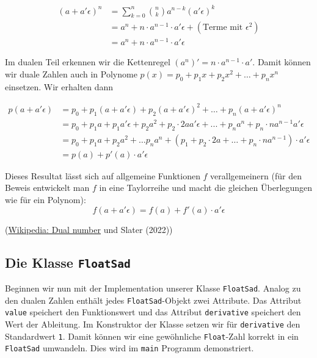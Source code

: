 \documentclass[
  a4paper,
  DIV=11]{scrreprt}
\theoremstyle{definition}
\theoremstyle{definition}
\theoremstyle{remark}
\begin{document}
\begin{tcolorbox}
\begin{align*}
    (a+a'\epsilon)^n &= \sum_{k=0}^n \binom n k a^{n-k} (a'\epsilon)^k  \\
    &= a^n + n \cdot a^{n-1} \cdot a'\epsilon + (\textrm{Terme mit }\epsilon^2) \\ 
    &= a^n + n \cdot a^{n-1} \cdot a' \epsilon
\end{align*}

Im dualen Teil erkennen wir die Kettenregel
\((a^n)' = n\cdot a^{n-1}\cdot a'\). Damit können wir duale Zahlen auch
in Polynome \(p(x) = p_0 + p_1 x + p_2 x^2 + \ldots + p_n x^n\)
einsetzen. Wir erhalten dann

\begin{align*}
    p(a+a'\epsilon) &= p_0 + p_1 (a+a'\epsilon) + p_2 (a+a'\epsilon)^2 + \ldots + p_n (a+a'\epsilon)^n \\ 
    &= p_0 + p_1 a + p_1 a'\epsilon + p_2 a^2 + p_2 \cdot 2a a' \epsilon + ... + p_n a^n + p_n \cdot n a^{n-1} a' \epsilon \\ 
    &= p_0 + p_1 a + p_2 a^2 + \ldots p_n a^n + (p_1 + p_2 \cdot 2a + \ldots + p_n \cdot n a^{n-1}) \cdot a' \epsilon \\
    &= p(a) + p'(a) \cdot a'\epsilon
\end{align*}

Dieses Resultat lässt sich auf allgemeine Funktionen \(f\)
verallgemeinern (für den Beweis entwickelt man \(f\) in eine Taylorreihe
und macht die gleichen Überlegungen wie für ein Polynom): \[
f(a+a'\epsilon) = f(a) + f'(a)\cdot a'\epsilon
\]

(\href{https://en.wikipedia.org/wiki/Dual_number}{Wikipedia: Dual
number} und Slater (2022))

\end{tcolorbox}

\hypertarget{sec-FoatSadClassDescription}{%
\subsection{\texorpdfstring{Die Klasse
\texttt{FloatSad}}{Die Klasse FloatSad}}\label{sec-FoatSadClassDescription}}

Beginnen wir nun mit der Implementation unserer Klasse
\texttt{FloatSad}. Analog zu den dualen Zahlen enthält jedes
\texttt{FloatSad}-Objekt zwei Attribute. Das Attribut \texttt{value}
speichert den Funktionswert und das Attribut \texttt{derivative}
speichert den Wert der Ableitung. Im Konstruktor der Klasse setzen wir
für \texttt{derivative} den Standardwert \texttt{1}. Damit können wir
eine gewöhnliche \texttt{Float}-Zahl korrekt in ein \texttt{FloatSad}
umwandeln. Dies wird im \texttt{main} Programm demonstriert.
\end{document}
